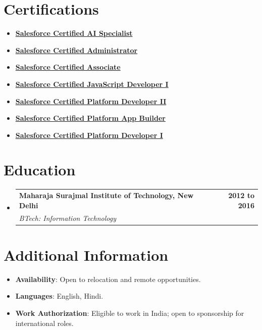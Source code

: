 \documentclass[letterpaper,11pt]{article}
\makeatletter
\newenvironment{bullets}{
\vspace{-1mm}
\begin{itemize}[leftmargin=0.15in]
\itemsep1pt 
\parskip1pt 
\parsep1.5pt
}{
\end{itemize}
\vspace{-\topsep}
}
\newcommand{\resumeSubheading}[4]{
  \vspace{-2pt}\item
    \begin{tabular*}{1.0\textwidth}[t]{l@{\extracolsep{\fill}}r}
      \textbf{#1} & \textbf{\small #2} \\
      \textit{\small#3} & \textit{\small #4} \\
    \end{tabular*}\vspace{-7pt}
}
\newcommand{\resumeSubHeadingListStart}{\begin{itemize}[leftmargin=0.0in, label={}]}
\newcommand{\resumeSubHeadingListEnd}{\end{itemize}}
\makeatother
\begin{document}
\section{Certifications}
\vspace{5pt}
\begin{bullets}
    \item{ \href{https://drive.google.com/file/d/1ZH6tkB-QozJJPuZg1oJ8WGltry3zPYeG/view?usp=drive_link}{\textbf{Salesforce Certified AI Specialist}}}
    \item{ \href{https://drive.google.com/file/d/1-RgapvkDj3nAkf7mZ-ZCWyU84bVv-_H-/view?usp=sharing}{\textbf{Salesforce Certified Administrator}}}
    \item{ \href{https://drive.google.com/file/d/1TuZnLjAyLHAq5NQUGI8TQ5cgRBeyxXPZ/view?usp=drive_link}{\textbf{Salesforce Certified Associate}}}
    \item{ \href{https://drive.google.com/file/d/1RtI15EO58hGov9kkZE8f5XPdP4EKJqH7/view?usp=drive_link}{\textbf{Salesforce Certified JavaScript Developer I}}}
    \item{ \href{https://drive.google.com/file/d/1Jh2mNRjd8Xzzx3lZ7z39IWtpcioqQfOg/view?usp=drive_link}{\textbf{Salesforce Certified Platform Developer II}}}
    \item{ \href{https://drive.google.com/file/d/1c9bhlkXrXFtiIHvU_2ioXgbB-kzD-kyD/view?usp=drive_link}{\textbf{Salesforce Certified Platform App Builder}}}
    \item{ \href{https://drive.google.com/file/d/1DATD3jtgAAiVoSmuVPzzrQRL1V2wIY0s/view?usp=drive_link}{\textbf{Salesforce Certified Platform Developer I}}}
\end{bullets}

\section{Education}
\vspace{1pt}
  \resumeSubHeadingListStart
    \resumeSubheading
      {Maharaja Surajmal Institute of Technology, New Delhi}{2012 to 2016}
      {BTech: Information Technology}{}
      
  \resumeSubHeadingListEnd
\vspace{-10pt}

\section{Additional Information}
    \vspace{3pt}
    \begin{bullets}
        \item {\textbf{Availability}: Open to relocation and remote opportunities.}
        \item {\textbf{Languages}: English, Hindi.}
        \item {\textbf{Work Authorization}: Eligible to work in India; open to sponsorship for international roles.}
    \end{bullets}
    
\end{document}
